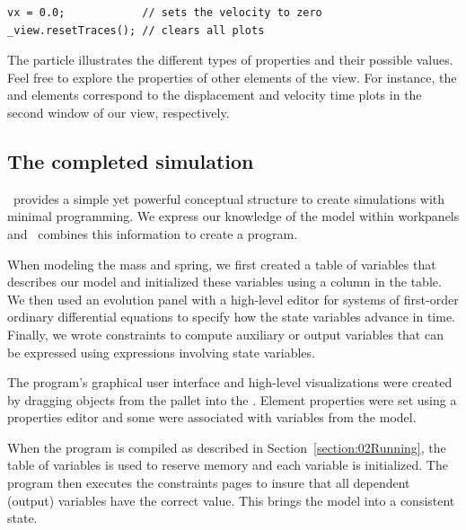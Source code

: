 \begin{listing}
\begin{verbatim}
vx = 0.0;            // sets the velocity to zero
_view.resetTraces(); // clears all plots
\end{verbatim}
\end{listing}


The particle illustrates the different types of properties and their possible values. Feel free to explore the properties of other elements of the view.  For instance, the  and  elements correspond to the displacement and velocity time plots in the second window of our view, respectively.

\subsection{The completed simulation}
\Ejs\ provides a simple yet powerful conceptual structure to create simulations with minimal programming. We express
our knowledge of the model within workpanels and \ejs\ combines this information to create a program.

When modeling the mass and spring, we first created a table of variables that describes our model and initialized these
variables using a column in the table. We then used an evolution panel with a high-level editor for systems of
first-order ordinary differential equations to specify how the state variables advance in time. Finally, we wrote
constraints to compute auxiliary or output variables that can be expressed using expressions involving state variables.

The program's graphical user interface and high-level visualizations were created by dragging objects from the
 pallet into the . Element properties were set using a properties editor and some were associated with variables from the model.

When the program is compiled as described in Section~\ref{section:02Running}, the table of variables is used to reserve memory and each variable is initialized. The program then executes the constraints pages to insure that all dependent (output) variables have the correct value. This brings the model into a consistent state.

